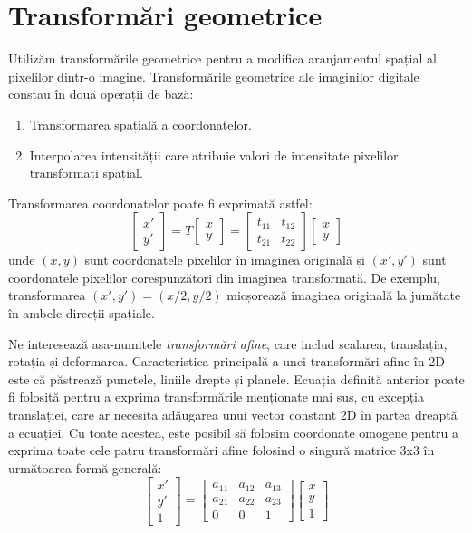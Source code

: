 \documentclass[a4paper,12pt]{report}
\begin{document}
\section{Transformări geometrice}
Utilizăm transformările geometrice pentru a modifica aranjamentul spațial al pixelilor dintr-o imagine. Transformările geometrice ale imaginilor digitale constau în două operații de bază:
\begin{enumerate}
    \item Transformarea spațială a coordonatelor.
    \item Interpolarea intensității care atribuie valori de intensitate pixelilor transformați spațial.
\end{enumerate}

Transformarea coordonatelor poate fi exprimată astfel:
\[
    \begin{bmatrix}
        x' \\
        y'
    \end{bmatrix}
    =
    T
    \begin{bmatrix}
        x \\
        y
    \end{bmatrix}
    =
    \begin{bmatrix}
        t_{11} & t_{12} \\
        t_{21} & t_{22}
    \end{bmatrix}
    \begin{bmatrix}
        x \\
        y
    \end{bmatrix}
\]
unde $(x, y)$ sunt coordonatele pixelilor în imaginea originală și $(x', y')$ sunt coordonatele pixelilor corespunzători din imaginea transformată. De exemplu, transformarea $(x', y') = (x/2, y/2)$ micșorează imaginea originală la jumătate în ambele direcții spațiale.

Ne interesează așa-numitele \textit{transformări afine}, care includ scalarea, translația, rotația și deformarea. Caracteristica principală a unei transformări afine în 2D este că păstrează punctele, liniile drepte și planele. Ecuația definită anterior poate fi folosită pentru a exprima transformările menționate mai sus, cu excepția translației, care ar necesita adăugarea unui vector constant 2D în partea dreaptă a ecuației. Cu toate acestea, este posibil să folosim coordonate omogene pentru a exprima toate cele patru transformări afine folosind o singură matrice 3x3 în următoarea formă generală:
\[
    \begin{bmatrix}
        x' \\
        y' \\
        1
    \end{bmatrix}
    =
    \begin{bmatrix}
        a_{11} & a_{12} & a_{13} \\
        a_{21} & a_{22} & a_{23} \\
        0      & 0      & 1
    \end{bmatrix}
    \begin{bmatrix}
        x \\
        y \\
        1
    \end{bmatrix}
\]
\end{document}
